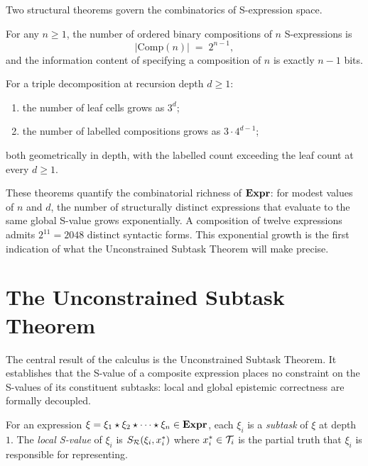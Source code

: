 Two structural theorems govern the combinatorics of S-expression space.

\begin{theorem}\label{thm:comp-mult}
For any $n \geq 1$, the number of ordered binary compositions of $n$ S-expressions is
\[
|\mathrm{Comp}(n)| \;=\; 2^{n-1},
\]
and the information content of specifying a composition of $n$ is exactly $n-1$ bits.
\end{theorem}

\begin{theorem}\label{thm:rec-growth}
For a triple decomposition at recursion depth $d \geq 1$:
\begin{enumerate}[nosep, label=(\roman*)]
  \item the number of leaf cells grows as $3^d$;
  \item the number of labelled compositions grows as $3 \cdot 4^{d-1}$;
\end{enumerate}
both geometrically in depth, with the labelled count exceeding the leaf count at every $d \geq 1$.
\end{theorem}

These theorems quantify the combinatorial richness of $\mathbf{Expr}$: for modest values of $n$ and $d$, the number of structurally distinct expressions that evaluate to the same global S-value grows exponentially. A composition of twelve expressions admits $2^{11} = 2048$ distinct syntactic forms. This exponential growth is the first indication of what the Unconstrained Subtask Theorem will make precise.


\section{The Unconstrained Subtask Theorem}
\label{sec:unconstrained-subtask}

The central result of the calculus is the Unconstrained Subtask Theorem. It establishes that the S-value of a composite expression places no constraint on the S-values of its constituent subtasks: local and global epistemic correctness are formally decoupled.

\begin{definition}[Subtask]\label{def:subtask}
For an expression $\xi = \xi_1 \star \xi_2 \star \cdots \star \xi_n \in \mathbf{Expr}$, each $\xi_i$ is a \emph{subtask} of $\xi$ at depth $1$. The \emph{local S-value} of $\xi_i$ is $S_{\mathcal{R}}(\xi_i, x^*_i)$ where $x^*_i \in \mathcal{T}_i$ is the partial truth that $\xi_i$ is responsible for representing.
\end{definition}

